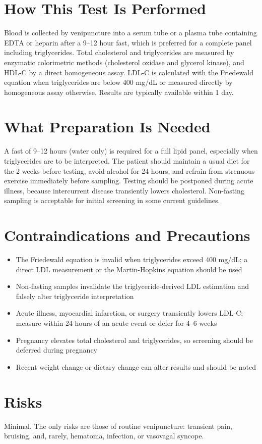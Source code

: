 \section*{How This Test Is Performed}
Blood is collected by venipuncture into a serum tube or a plasma tube containing EDTA or heparin after a 9--12 hour fast, which is preferred for a complete panel including triglycerides. Total cholesterol and triglycerides are measured by enzymatic colorimetric methods (cholesterol oxidase and glycerol kinase), and HDL-C by a direct homogeneous assay. LDL-C is calculated with the Friedewald equation when triglycerides are below 400 mg/dL or measured directly by homogeneous assay otherwise. Results are typically available within 1 day.
\section*{What Preparation Is Needed}
A fast of 9--12 hours (water only) is required for a full lipid panel, especially when triglycerides are to be interpreted. The patient should maintain a usual diet for the 2 weeks before testing, avoid alcohol for 24 hours, and refrain from strenuous exercise immediately before sampling. Testing should be postponed during acute illness, because intercurrent disease transiently lowers cholesterol. Non-fasting sampling is acceptable for initial screening in some current guidelines.
\section*{Contraindications and Precautions}
\begin{itemize}
  \item The Friedewald equation is invalid when triglycerides exceed 400 mg/dL; a direct LDL measurement or the Martin-Hopkins equation should be used
  \item Non-fasting samples invalidate the triglyceride-derived LDL estimation and falsely alter triglyceride interpretation
  \item Acute illness, myocardial infarction, or surgery transiently lowers LDL-C; measure within 24 hours of an acute event or defer for 4--6 weeks
  \item Pregnancy elevates total cholesterol and triglycerides, so screening should be deferred during pregnancy
  \item Recent weight change or dietary change can alter results and should be noted
\end{itemize}
\section*{Risks}
Minimal. The only risks are those of routine venipuncture: transient pain, bruising, and, rarely, hematoma, infection, or vasovagal syncope.
